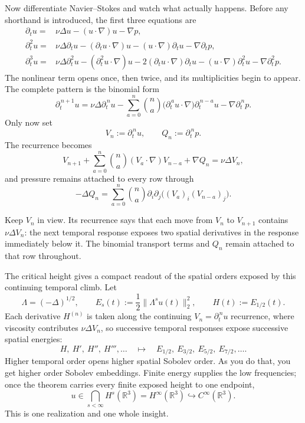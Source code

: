 Now differentiate Navier--Stokes and watch what actually happens. Before any
shorthand is introduced, the first three equations are
\[
\begin{aligned}
\partial_tu
={}&\nu\Delta u
 -(u\!\cdot\nabla)u
 -\nabla p,\\[3pt]
\partial_t^2u
={}&\nu\Delta\partial_tu
 -(\partial_tu\!\cdot\nabla)u
 -(u\!\cdot\nabla)\partial_tu
 -\nabla\partial_tp,\\[3pt]
\partial_t^3u
={}&\nu\Delta\partial_t^2u
 -(\partial_t^2u\!\cdot\nabla)u
 -2(\partial_tu\!\cdot\nabla)\partial_tu
 -(u\!\cdot\nabla)\partial_t^2u
 -\nabla\partial_t^2p.
\end{aligned}
\]
The nonlinear term opens once, then twice, and its multiplicities begin to
appear. The complete pattern is the binomial form
\[
\partial_t^{\,n+1}u
=\nu\Delta\partial_t^{\,n}u
-\sum_{a=0}^{n}\binom na
  \bigl(\partial_t^{\,a}u\!\cdot\nabla\bigr)
  \partial_t^{\,n-a}u
-\nabla\partial_t^{\,n}p.
\]
Only now set
\[
V_n:=\partial_t^{\,n}u,
\qquad
Q_n:=\partial_t^{\,n}p.
\]
The recurrence becomes
\[
V_{n+1}
+\sum_{a=0}^{n}\binom na
  (V_a\!\cdot\nabla)V_{n-a}
+\nabla Q_n
=\nu\Delta V_n,
\]
and pressure remains attached to every row through
\[
-\Delta Q_n
=\sum_{a=0}^{n}\binom na
  \partial_i\partial_j
  \bigl((V_a)_i(V_{n-a})_j\bigr).
\]

Keep \(V_n\) in view. Its recurrence says that each move from \(V_n\) to
\(V_{n+1}\) contains \(\nu\Delta V_n\): the next temporal response exposes two
spatial derivatives in the response immediately below it. The binomial
transport terms and \(Q_n\) remain attached to that row throughout.

The critical height gives a compact readout of the spatial orders exposed by
this continuing temporal climb. Let
\[
\Lambda=(-\Delta)^{1/2},
\qquad
E_s(t):=\frac12\|\Lambda^su(t)\|_2^2,
\qquad
H(t):=E_{1/2}(t).
\]
Each derivative \(H^{(n)}\) is taken along the continuing
\(V_n=\partial_t^{\,n}u\) recurrence, where viscosity contributes
\(\nu\Delta V_n\), so successive temporal responses expose successive spatial
energies:
\[
H,\ H',\ H'',\ H''',\ldots
\quad\longmapsto\quad
E_{1/2},\ E_{3/2},\ E_{5/2},\ E_{7/2},\ldots .
\]
Higher temporal order opens higher spatial Sobolev order. As you do that, you
get higher order Sobolev embeddings. Finite energy supplies the low
frequencies; once the theorem carries every finite exposed height to one
endpoint,
\[
u\in\bigcap_{s<\infty}H^s(\mathbb R^3)
=H^\infty(\mathbb R^3)
\hookrightarrow C^\infty(\mathbb R^3).
\]
This is one realization and one whole insight.

